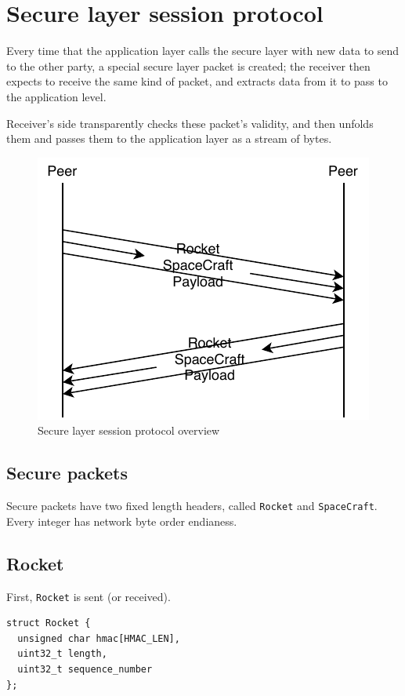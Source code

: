 \documentclass[a4paper,12pt]{article}
\begin{document}
\section{Secure layer session protocol}
Every time that the application layer calls the secure layer with new data to send to the other party, a special secure layer packet is created; the receiver then expects to receive the same kind of packet, and extracts data from it to pass to the application level.

Receiver's side transparently checks these packet's validity, and then unfolds them and passes them to the application layer as a stream of bytes.

\begin{figure}[H]
\centering
\includegraphics{img/secure-session-protocol.pdf}
\caption{Secure layer session protocol overview}
\label{img:secure-session-protocol}
\end{figure}

\subsection{Secure packets}
Secure packets have two fixed length headers, called \texttt{Rocket} and \texttt{SpaceCraft}.
Every integer has network byte order endianess.

\subsection{Rocket}
First, \texttt{Rocket} is sent (or received).

\begin{verbatim}
struct Rocket {
  unsigned char hmac[HMAC_LEN],
  uint32_t length,
  uint32_t sequence_number
};
\end{verbatim}
\end{document}

